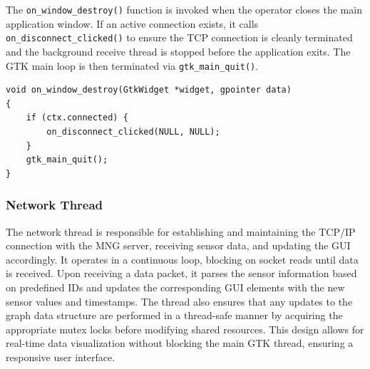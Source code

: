 The \texttt{on\_window\_destroy()} function is invoked when the operator
closes the main application window. If an active connection exists, it
calls \texttt{on\_disconnect\_clicked()} to ensure the TCP connection is
cleanly terminated and the background receive thread is stopped before
the application exits. The GTK main loop is then terminated via
\texttt{gtk\_main\_quit()}.

\begin{verbatim}
void on_window_destroy(GtkWidget *widget, gpointer data)
{
    if (ctx.connected) {
        on_disconnect_clicked(NULL, NULL);
    }
    gtk_main_quit();
}
\end{verbatim}



\subsubsection{Network Thread}
The network thread is responsible for establishing and maintaining the TCP/IP connection with the MNG server, receiving sensor data, and updating the GUI accordingly. It operates in a continuous loop, blocking on socket reads until data is received. Upon receiving a data packet, it parses the sensor information based on predefined IDs and updates the corresponding GUI elements with the new sensor values and timestamps. The thread also ensures that any updates to the graph data structure are performed in a thread-safe manner by acquiring the appropriate mutex locks before modifying shared resources. This design allows for real-time data visualization without blocking the main GTK thread, ensuring a responsive user interface.

